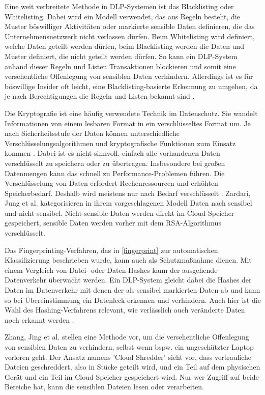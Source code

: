 Eine weit verbreitete Methode in DLP-Systemen ist das Blacklisting oder Whitelisting. Dabei wird ein Modell verwendet, das aus Regeln besteht, die Muster böswilliger Aktivitäten oder markierte sensible Daten definieren, die das Unternehmensnetzwerk nicht verlassen dürfen. Beim Whitelisting wird definiert, welche Daten geteilt werden dürfen, beim Blacklisting werden die Daten und Muster definiert, die nicht geteilt werden dürfen. So kann ein DLP-System anhand dieser Regeln und Listen Transaktionen blockieren und somit eine versehentliche Offenlegung von sensiblen Daten verhindern. Allerdings ist es für böswillige Insider oft leicht, eine Blacklisting-basierte Erkennung zu umgehen, da je nach Berechtigungen die Regeln und Listen bekannt sind \cite{Costante.2016}.

Die Kryptografie ist eine häufig verwendete Technik im Datenschutz. Sie wandelt Informationen von einem lesbaren Format in ein verschlüsseltes Format um. Je nach Sicherheitsstufe der Daten können unterschiedliche Verschlüsselungsalgorithmen und kryptografische Funktionen zum Einsatz kommen \cite{HerreraMontano.2022}. Dabei ist es nicht sinnvoll, einfach alle vorhandenen Daten verschlüsselt zu speichern oder zu übertragen. Insbesondere bei großen Datenmengen kann das schnell zu Performance-Problemen führen. Die Verschlüsselung von Daten erfordert Rechenressourcen und erhöhten Speicherbedarf. Deshalb wird meistens nur nach Bedarf verschlüsselt \cite{Arki.2023}.
Zardari, Jung et al. \cite{Zardari.2014} kategorisieren in ihrem vorgeschlagenen Modell Daten nach sensibel und nicht-sensibel. Nicht-sensible Daten werden direkt im Cloud-Speicher gespeichert, sensible Daten werden vorher mit dem RSA-Algorithmus verschlüsselt.

Das Fingerprinting-Verfahren, das in \ref{fingerprint} zur automatischen Klassifizierung beschrieben wurde, kann auch als Schutzmaßnahme dienen. Mit einem Vergleich von Datei- oder Daten-Hashes kann der ausgehende Datenverkehr überwacht werden. Ein DLP-System gleicht dabei die Hashes der Daten im Datenverkehr mit denen der als sensibel markierten Daten ab und kann so bei Übereinstimmung ein Datenleck erkennen und verhindern. Auch hier ist die Wahl des Hashing-Verfahrens relevant, wie verlässlich auch veränderte Daten noch erkannt werden \cite{HerreraMontano.2022}.

Zhang, Jing et al. \cite{Zhang.2011} stellen eine Methode vor, um die versehentliche Offenlegung von sensiblen Daten zu verhindern, selbst wenn bspw. ein ungeschützter Laptop verloren geht. Der Ansatz namens 'Cloud Shredder' sieht vor, dass vertrauliche Dateien geschreddert, also in Stücke geteilt wird, und ein Teil auf dem physischen Gerät und ein Teil im Cloud-Speicher gespeichert wird. Nur wer Zugriff auf beide Bereiche hat, kann die sensiblen Dateien lesen oder verarbeiten.

